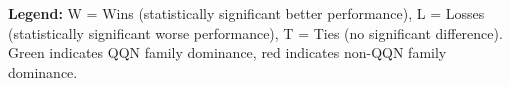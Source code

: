 \documentclass{article}
\begin{document}
\begin{table}[htbp]
\centering
\caption{Optimizer Family Comparison Matrix}
\label{tab:family_comparison_matrix}
\end{table}
\textbf{Legend:} W = Wins (statistically significant better performance), L = Losses (statistically significant worse performance), T = Ties (no significant difference). Green indicates QQN family dominance, red indicates non-QQN family dominance.
\end{document}
